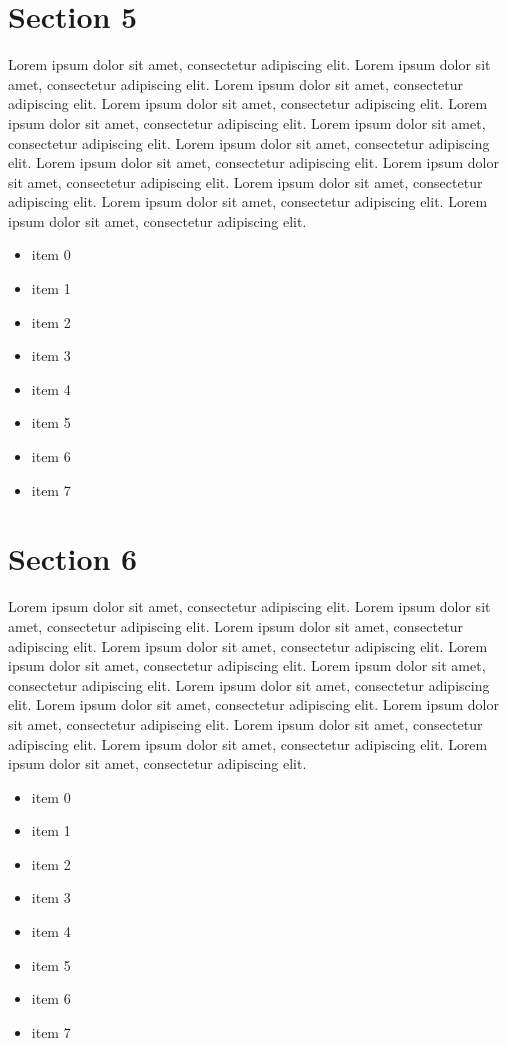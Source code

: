 \documentclass{article}
\begin{document}
\section{Section 5}
Lorem ipsum dolor sit amet, consectetur adipiscing elit. Lorem ipsum dolor sit amet, consectetur adipiscing elit. Lorem ipsum dolor sit amet, consectetur adipiscing elit. Lorem ipsum dolor sit amet, consectetur adipiscing elit. Lorem ipsum dolor sit amet, consectetur adipiscing elit. Lorem ipsum dolor sit amet, consectetur adipiscing elit. Lorem ipsum dolor sit amet, consectetur adipiscing elit. Lorem ipsum dolor sit amet, consectetur adipiscing elit. Lorem ipsum dolor sit amet, consectetur adipiscing elit. Lorem ipsum dolor sit amet, consectetur adipiscing elit. Lorem ipsum dolor sit amet, consectetur adipiscing elit. Lorem ipsum dolor sit amet, consectetur adipiscing elit. 
\begin{itemize}
\item item 0
\item item 1
\item item 2
\item item 3
\item item 4
\item item 5
\item item 6
\item item 7
\end{itemize}

\section{Section 6}
Lorem ipsum dolor sit amet, consectetur adipiscing elit. Lorem ipsum dolor sit amet, consectetur adipiscing elit. Lorem ipsum dolor sit amet, consectetur adipiscing elit. Lorem ipsum dolor sit amet, consectetur adipiscing elit. Lorem ipsum dolor sit amet, consectetur adipiscing elit. Lorem ipsum dolor sit amet, consectetur adipiscing elit. Lorem ipsum dolor sit amet, consectetur adipiscing elit. Lorem ipsum dolor sit amet, consectetur adipiscing elit. Lorem ipsum dolor sit amet, consectetur adipiscing elit. Lorem ipsum dolor sit amet, consectetur adipiscing elit. Lorem ipsum dolor sit amet, consectetur adipiscing elit. Lorem ipsum dolor sit amet, consectetur adipiscing elit. 
\begin{itemize}
\item item 0
\item item 1
\item item 2
\item item 3
\item item 4
\item item 5
\item item 6
\item item 7
\end{itemize}
\end{document}
